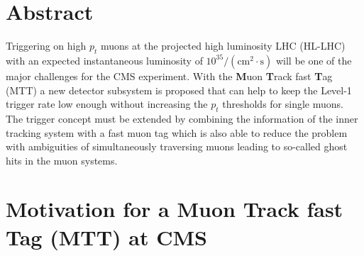 \section{Abstract}
Triggering on high $p_t$ muons at the projected high luminosity LHC (HL-LHC) with an expected instantaneous luminosity of $10^{35}/(\mathrm{cm}^2 \cdot\mathrm{s})$ will be 
one of the major challenges for the CMS experiment. With the {\bf M}uon  {\bf T}rack fast {\bf T}ag (MTT) a new detector subsystem is proposed that can help to keep the 
Level-1 trigger rate low enough without increasing the $p_t$ thresholds for single muons. The trigger concept must be extended by combining the information of the inner tracking
system with a fast muon tag which is also able to reduce the problem with ambiguities of simultaneously traversing muons leading to so-called ghost hits in the muon systems. 

\section{Motivation for a Muon Track fast Tag (MTT) at CMS}

